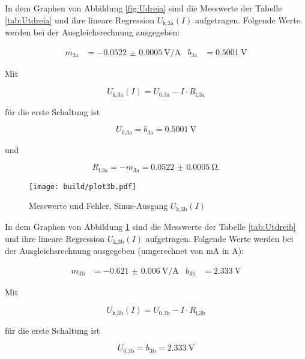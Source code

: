 \FloatBarrier

  In dem Graphen von Abbildung \ref{fig:Udreia} sind die Messwerte der Tabelle
  \ref{tab:Utdreia} und ihre lineare Regression
  $U_\text{k,3a}(I)$ aufgetragen.
  Folgende Werte werden bei der Ausgleichsrechnung ausgegeben:


  \begin{align}
    m_\text{3a} & = \SI{-0.0522(5)}{\V\per\A} & b_\text{3a} & = \SI{0.5001}{\V}
  \end{align}

  Mit

  \begin{equation}
    U_\text{k,3a}(I) = U_\text{0,3a} - I \cdot R_\text{i,3a}
  \end{equation}

  für die erste Schaltung ist

  \begin{equation}
    U_\text{0,3a} = b_\text{3a} = \SI{0.5001}{\V}
  \end{equation}

  und

  \begin{equation}
    R_\text{i,3a} = -m_\text{3a} = \SI{0.0522(5)}{\ohm}.
  \end{equation}

  \begin{figure}[h]
    \centering
    \texttt{[image: build/plot3b.pdf]}
    \caption{Messwerte und Fehler, Sinus-Ausgang $U_\text{k,3b}(I)$}
    \label{fig:Udreib}
  \end{figure}

  In dem Graphen von Abbildung \ref{fig:Udreib} sind die Messwerte der Tabelle
  \ref{tab:Utdreib} und ihre lineare Regression
  $U_\text{k,3b}(I)$ aufgetragen.
  Folgende Werte werden bei der Ausgleichsrechnung ausgegeben (umgerechnet von
  \si{\milli\A} in \si{\A}):

  \begin{align}
    m_\text{3b} & = \SI{-0.621(6)}{\V\per\A} & b_\text{3b} & = \SI{2.333}{\V}
  \end{align}

  Mit

  \begin{equation}
    U_\text{k,3b}(I) = U_\text{0,3b} - I \cdot R_\text{i,3b}
  \end{equation}

  für die erste Schaltung ist

  \begin{equation}
    U_\text{0,3b} = b_\text{3b} = \SI{2.333}{\V}
  \end{equation}

